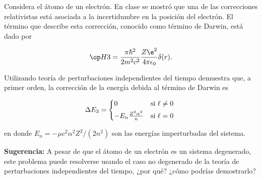 \documentclass[./../main.tex]{subfiles}
\begin{document}
    \begin{exercise}
        Considera el átomo de un electrón. En clase se mostró que una de las correcciones relativistas está asociada a la incertidumbre en la posición del electrón. El término que describe esta corrección, conocido como término de Darwin, está dado por

        \begin{equation*}
            \observable{H}[3] = \dfrac{\pi\hbar^{2}}{2m^{2}c^{2}}\dfrac{Z\e^{2}}{4\pi\epsilon_{0}}\delta(r).
        \end{equation*}

        Utilizando teoría de perturbaciones independientes del tiempo demuestra que, a primer orden, la corrección de la energía debida al término de Darwin es

        \begin{equation*}
            \change{E_{3}} =
            \begin{cases*}
                0 & si \(\ell \neq 0\)\\
                -E_{n}\tfrac{Z^{2}\alpha^{2}}{n} & si \(\ell = 0\)
            \end{cases*}
        \end{equation*}

        en donde \(E_{n} = -\mu c^{2}\alpha^{2}Z^{2}/(2n^{2})\) son las energías imperturbadas del sistema.

        \textbf{Sugerencia:} A pesar de que el átomo de un electrón es un sistema degenerado, este problema puede resolverse usando el caso no degenerado de la teoría de perturbaciones independientes del tiempo, ¿por qué? ¿cómo podrías demostrarlo?
    \end{exercise}
\end{document}

